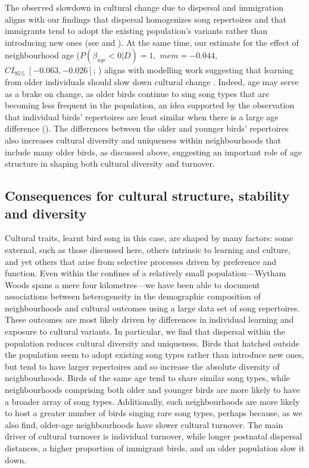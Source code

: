 \documentclass[9pt, onecolumn, twoside, lineno]{gsajnl}
\begin{document}
The observed slowdown in cultural change due to dispersal and immigration aligns with our findings that dispersal homogenizes song repertoires and that immigrants tend to adopt the existing population's variants rather than introducing new ones (see  and ). At the same time, our estimate for the effect of neighbourhood age ($P(\beta_{\overline{age}} < 0 | D) = 1,$ $mem=-0.044,$ $CI_{95\%}~[-0.063, -0.026]$; ) aligns with modelling work suggesting that learning from older individuals should slow down cultural change \autocite{kirby2021}. Indeed, age may serve as a brake on change, as older birds continue to sing song types that are becoming less frequent in the population, an idea supported by the observation that individual birds' repertoires are least similar when there is a large age difference (). The differences between the older and younger birds' repertoires also increases cultural diversity and uniqueness within neighbourhoods that include many older birds, as discussed above, suggesting an important role of age structure in shaping both cultural diversity and turnover.

\subsection{Consequences for cultural structure, stability and diversity}

Cultural traits, learnt bird song in this case, are shaped by many factors: some external, such as those discussed here, others intrinsic to learning and culture, and yet others that arise from selective processes driven by preference and function. Even within the confines of a relatively small population---Wytham Woods spans a mere four kilometres---we have been able to document associations between heterogeneity in the demographic composition of neighbourhoods and cultural outcomes using a large data set of song repertoires. These outcomes are most likely driven by differences in individual learning and exposure to cultural variants. In particular, we find that dispersal within the population reduces cultural diversity and uniqueness. Birds that hatched outside the population seem to adopt existing song types rather than introduce new ones, but tend to have larger repertoires and so increase the absolute diversity of neighbourhoods. Birds of the same age tend to share similar song types, while neighbourhoods comprising both older and younger birds are more likely to have a broader array of song types. Additionally, such neighbourhoods are more likely to host a greater number of birds singing rare song types, perhaps because, as we also find, older-age neighbourhoods have slower cultural turnover. The main driver of cultural turnover is individual turnover, while longer postnatal dispersal distances, a higher proportion of immigrant birds, and an older population slow it down. 
\end{document}
